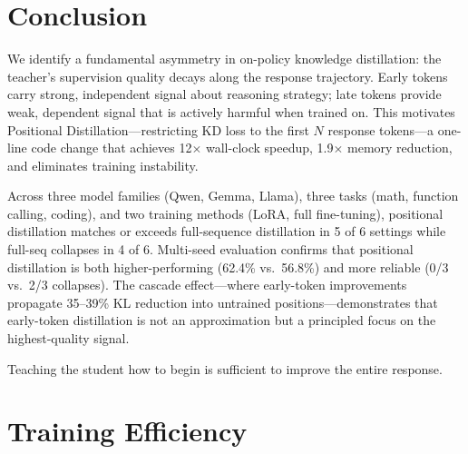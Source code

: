 \documentclass[10pt]{article}
\newcommand{\methodfull}{Positional Distillation}
\begin{document}
\section{Conclusion}
\label{sec:conclusion}

We identify a fundamental asymmetry in on-policy knowledge distillation: the teacher's supervision quality decays along the response trajectory. Early tokens carry strong, independent signal about reasoning strategy; late tokens provide weak, dependent signal that is actively harmful when trained on. This motivates \methodfull{}---restricting KD loss to the first $N$ response tokens---a one-line code change that achieves 12$\times$ wall-clock speedup, 1.9$\times$ memory reduction, and eliminates training instability.

Across three model families (Qwen, Gemma, Llama), three tasks (math, function calling, coding), and two training methods (LoRA, full fine-tuning), positional distillation matches or exceeds full-sequence distillation in 5 of 6 settings while full-seq collapses in 4 of 6. Multi-seed evaluation confirms that positional distillation is both higher-performing (62.4\% vs.\ 56.8\%) and more reliable (0/3 vs.\ 2/3 collapses). The cascade effect---where early-token improvements propagate 35--39\% KL reduction into untrained positions---demonstrates that early-token distillation is not an approximation but a principled focus on the highest-quality signal.

Teaching the student how to begin is sufficient to improve the entire response.






\appendix

\section{Training Efficiency}
\label{app:timing}
\end{document}
